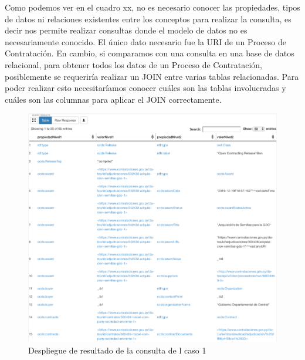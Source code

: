 Como podemos ver en el cuadro xx, no es necesario conocer las propiedades, tipos de datos ni relaciones existentes entre los conceptos para realizar la consulta, es decir nos permite realizar consultas donde el modelo de datos no es necesariamente conocido. El único dato necesario fue la URI de un Proceso de Contratación. En cambio, si comparamos con una consulta en una base de datos relacional, para obtener todos los datos de un Proceso de Contratación, posiblemente se requeriría realizar un JOIN entre varias tablas relacionadas. Para poder realizar esto necesitaríamos conocer cuáles son las tablas involucradas y cuáles son las columnas para aplicar el JOIN correctamente.


\begin{figure}[h!]
    \centering
    \includegraphics[width=150mm]{figuras/caso1Resultado.png}
    \caption{Despliegue de resultado de la consulta de l caso 1}
    \label{img:caso1Resultado}
 \end{figure}
